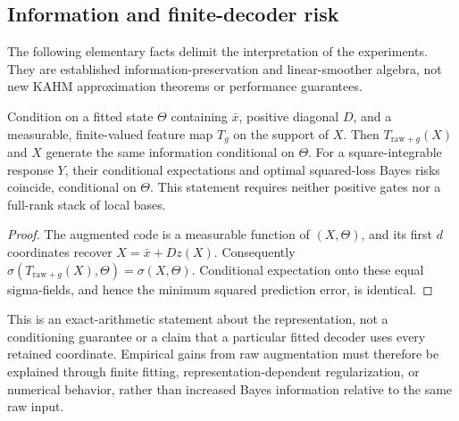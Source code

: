 \subsection{Information and finite-decoder risk}
\label{sec:nf-information}

The following elementary facts delimit the interpretation of the experiments.
They are established information-preservation and linear-smoother algebra,
not new KAHM approximation theorems or performance guarantees.

\begin{proposition}
\label{prop:nf-raw-preservation}
Condition on a fitted state $\Theta$ containing $\bar x$, positive diagonal
$D$, and a measurable, finite-valued feature map $T_g$ on the support of $X$.
Then $T_{\mathrm{raw}+g}(X)$ and $X$ generate the same information conditional
on $\Theta$.  For a square-integrable response $Y$, their conditional
expectations and optimal squared-loss Bayes risks coincide, conditional on
$\Theta$.  This statement requires neither positive gates nor a full-rank
stack of local bases.
\end{proposition}
\begin{proof}
The augmented code is a measurable function of $(X,\Theta)$, and its first
$d$ coordinates recover $X=\bar x+Dz(X)$.  Consequently
$\sigma(T_{\mathrm{raw}+g}(X),\Theta)=\sigma(X,\Theta)$.
Conditional expectation onto these equal sigma-fields, and hence the
minimum squared prediction error, is identical.
\end{proof}

This is an exact-arithmetic statement about the representation, not a
conditioning guarantee or a claim that a particular fitted decoder uses
every retained coordinate.  Empirical gains from raw augmentation must
therefore be explained through finite fitting, representation-dependent
regularization, or numerical behavior, rather than increased Bayes
information relative to the same raw input.

